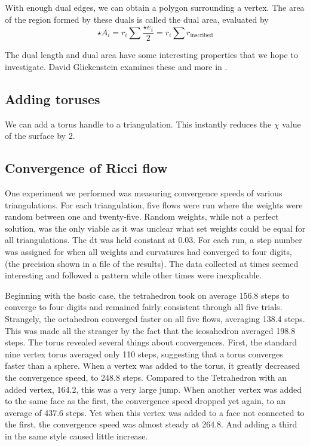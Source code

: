 \documentclass[12pt]{article}
\begin{document}
\noindent With enough dual edges, we can obtain a polygon surrounding a vertex. The area of the region formed by these duals is called the dual area, evaluated by $$\star A_i = r_i\sum{\frac{\star e_i}{2}} = r_i\sum{r_{\mbox{inscribed}}}$$

\noindent The dual length and dual area have some interesting properties that we hope to investigate. David Glickenstein examines these and more in \cite{Dave}.  

\subsection{Adding toruses}
\maketitle

We can add a torus handle to a triangulation. This instantly reduces the $\chi$ value of the surface by 2. 

\subsection{Convergence of Ricci flow}
\maketitle

One experiment we performed was measuring convergence speeds of various triangulations. For each triangulation, five flows were run where the weights were random between one and twenty-five. Random weights, while not a perfect solution, was the only viable as it was unclear what set weights could be equal for all triangulations. The dt was held constant at 0.03. For each run, a step number was assigned for when all weights and curvatures had converged to four digits, (the precision shown in a file of the results).  The data collected at times seemed interesting and followed a pattern while other times were inexplicable.\newline

\noindent Beginning with the basic case, the tetrahedron took on average 156.8 steps to converge to four digits and remained fairly consistent through all five trials. Strangely, the octahedron converged faster on all five flows, averaging 138.4 steps. This was made all the stranger by the fact that the icosahedron averaged 198.8 steps. The torus revealed several things about convergences. First, the standard nine vertex torus averaged only 110 steps, suggesting that a torus converges faster than a sphere. When a vertex was added to the torus, it greatly decreased the convergence speed, to 248.8 steps. Compared to the Tetrahedron with an added vertex, 164.2, this was a very large jump. When another vertex was added to the same face as the first, the convergence speed dropped yet again, to an average of 437.6 steps. Yet when this vertex was added to a face not connected to the first, the convergence speed was almost steady at 264.8. And adding a third in the same style caused little increase.\newline
\end{document}
